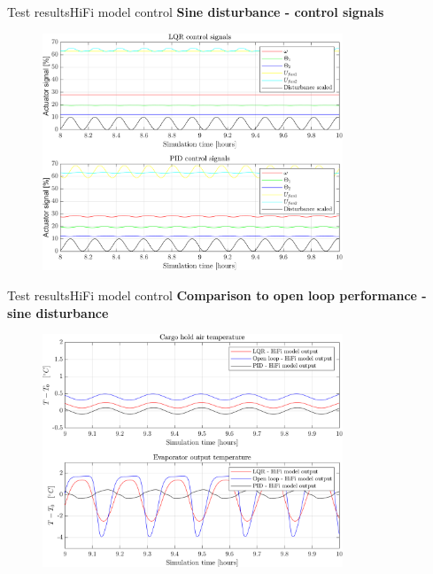 \begin{frame}{Test results}{HiFi model control}
	\textbf{Sine disturbance - control signals}
	\begin{figure}[H]
		\centering
		\includegraphics[width=0.8\textwidth]{../Graphics/fig_inputs_sineDist_zoom.png}
	\end{figure}
\end{frame}



\begin{frame}{Test results}{HiFi model control}
	\textbf{Comparison to open loop performance - sine disturbance}
	\begin{figure}[H]
		\centering
		\includegraphics[width=0.8\textwidth]{../Graphics/fig_LQRvsKresten_sineDist_OL_zoom.png}
	\end{figure} 
\end{frame}



